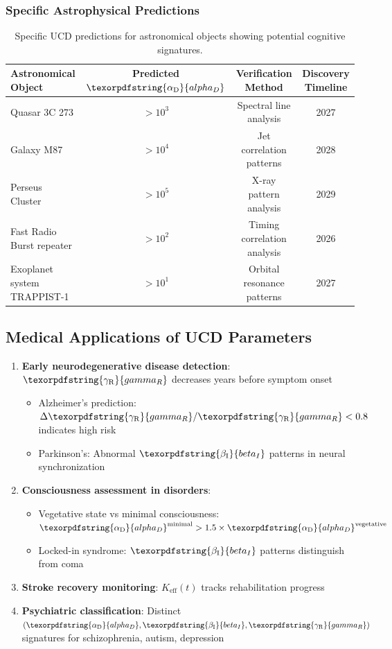 \documentclass[12pt,a4paper]{article}
\DeclareRobustCommand{\alD}{\texorpdfstring{\ensuremath{\alpha_{\mathrm{D}}}}{alpha_D}}
\DeclareRobustCommand{\beI}{\texorpdfstring{\ensuremath{\beta_{\mathrm{I}}}}{beta_I}}
\DeclareRobustCommand{\gaR}{\texorpdfstring{\ensuremath{\gamma_{\mathrm{R}}}}{gamma_R}}
\newcommand{\Ke}{K_{\mathrm{eff}}}
\begin{document}
	\subsubsection{Specific Astrophysical Predictions}
	
	\begin{table}[ht]
		\centering
		\begin{tabular}{lccc}
			\toprule
			\textbf{Astronomical Object} & \textbf{Predicted \(\alD\)} & \textbf{Verification Method} & \textbf{Discovery Timeline} \\
			\midrule
			Quasar 3C 273 & \(>10^3\) & Spectral line analysis & 2027 \\
			Galaxy M87 & \(>10^4\) & Jet correlation patterns & 2028 \\
			Perseus Cluster & \(>10^5\) & X-ray pattern analysis & 2029 \\
			Fast Radio Burst repeater & \(>10^2\) & Timing correlation analysis & 2026 \\
			Exoplanet system TRAPPIST-1 & \(>10^1\) & Orbital resonance patterns & 2027 \\
			\bottomrule
		\end{tabular}
		\caption{Specific UCD predictions for astronomical objects showing potential cognitive signatures.}
		\label{tab:astro-predictions}
	\end{table}
	
	\subsection{Medical Applications of UCD Parameters}
	
	\begin{enumerate}
		\item \textbf{Early neurodegenerative disease detection}: \(\gaR\) decreases years before symptom onset
		\begin{itemize}
			\item Alzheimer's prediction: \(\Delta\gaR/\gaR < 0.8\) indicates high risk
			\item Parkinson's: Abnormal \(\beI\) patterns in neural synchronization
		\end{itemize}
		
		\item \textbf{Consciousness assessment in disorders}:
		\begin{itemize}
			\item Vegetative state vs minimal consciousness: \(\alD^{\mathrm{minimal}} > 1.5 \times \alD^{\mathrm{vegetative}}\)
			\item Locked-in syndrome: \(\beI\) patterns distinguish from coma
		\end{itemize}
		
		\item \textbf{Stroke recovery monitoring}: \(\Ke(t)\) tracks rehabilitation progress
		\item \textbf{Psychiatric classification}: Distinct \((\alD, \beI, \gaR)\) signatures for schizophrenia, autism, depression
	\end{enumerate}
	
\end{document}
